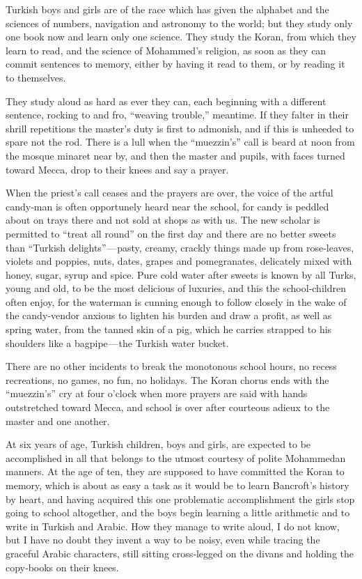 \documentclass[12pt]{book}
\begin{document}
Turkish boys and girls are of the race which has given the alphabet and the
sciences of numbers, navigation and astronomy to the world; but they study only
one book now and learn only one science. They study the Koran, from which
they learn to read, and the science of Mohammed’s religion, as soon as they can
commit sentences to memory, either by having it read to them, or by reading it to
themselves.

They study aloud as hard as ever they can, each beginning with a different
sentence, rocking to and fro, “weaving trouble,” meantime. If they falter in their
shrill repetitions the master’s duty is first to admonish, and if this is unheeded to
spare not the rod. There is a lull when the “muezzin’s” call is beard at noon from
the mosque minaret near by, and then the master and pupils, with faces turned
toward Mecca, drop to their knees and say a prayer.

When the priest’s call ceases and the prayers are over, the voice of the artful
candy‐man is often opportunely heard near the school, for candy is peddled about
on trays there and not sold at shops as with us. The new scholar is permitted
to “treat all round” on the first day and there are no better sweets than “Turkish
delights” — pasty, creamy, crackly things made up from rose‐leaves, violets and
poppies, nuts, dates, grapes and pomegranates, delicately mixed with honey,
sugar, syrup and spice. Pure cold water after sweets is known by all Turks, young
and old, to be the most delicious of luxuries, and this the school‐children often
enjoy, for the waterman is cunning enough to follow closely in the wake of the
candy‐vendor anxious to lighten his burden and draw a profit, as well as spring
water, from the tanned skin of a pig, which he carries strapped to his shoulders
like a bagpipe — the Turkish water bucket.

There are no other incidents to break the monotonous school hours, no recess recreations, no games, no fun, no holidays. The Koran chorus ends with
the “muezzin’s” cry at four o’clock when more prayers are said with hands outstretched toward Mecca, and school is over after courteous adieux to the master
and one another.

At six years of age, Turkish children, boys and girls, are expected to be
accomplished in all that belongs to the utmost courtesy of polite Mohammedan
manners. At the age of ten, they are supposed to have committed the Koran to
memory, which is about as easy a task as it would be to learn Bancroft’s history
by heart, and having acquired this one problematic accomplishment the girls
stop going to school altogether, and the boys begin learning a little arithmetic
and to write in Turkish and Arabic. How they manage to write aloud, I do not
know, but I have no doubt they invent a way to be noisy, even while tracing the
graceful Arabic characters, still sitting cross‐legged on the divans and holding
the copy‐books on their knees.
\end{document}
